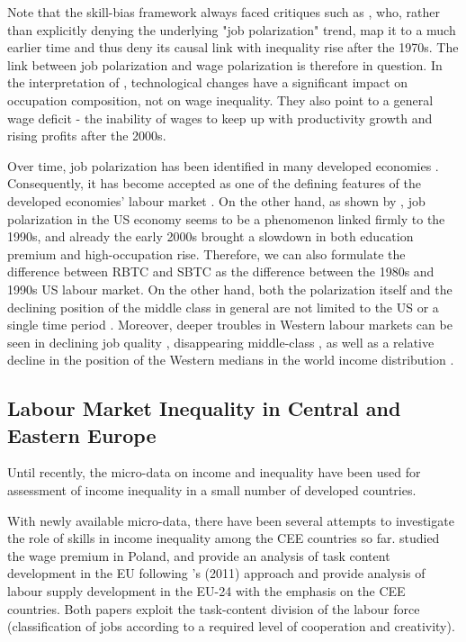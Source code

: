 \documentclass[11pt]{article}
\begin{document}
Note that the skill-bias framework always faced critiques such as \citet{mishel2013assessing}, who, rather than explicitly denying the underlying "job polarization" trend, map it to a much earlier time and thus deny its causal link with inequality rise after the 1970s. The link between job polarization and wage polarization is therefore in question. In the interpretation of \citeauthor{mishel2013assessing}, technological changes have a significant impact on occupation composition, not on wage inequality. They also point to a general wage deficit - the inability of wages to keep up with productivity growth and rising profits after the 2000s.

 Over time, job polarization has been identified in many developed economies \citep{rodrik2020economic, oecd2017}. Consequently, it has become accepted as one of the defining features of the developed economies' labour market \citep{howell2019declining}. On the other hand, as shown by \citet{mishel2013assessing}, job polarization in the US economy seems to be a phenomenon linked firmly to the 1990s, and already the early 2000s brought a slowdown in both education premium and high-occupation rise. Therefore, we can also formulate the difference between RBTC and SBTC as the difference between the 1980s and 1990s US labour market. On the other hand, both the polarization itself and the declining position of the middle class in general are not limited to the US or a single time period \citep{temin2018vanishing, rodrik2020economic}. Moreover, deeper troubles in Western labour markets can be seen in declining job quality \citep{howell2019declining}, disappearing middle-class \citep{temin2018vanishing}, as well as a relative decline in the position of the Western medians in the world income distribution \citep{milanovic2020elephant}.



\subsection{Labour Market Inequality in Central and Eastern Europe}
Until recently, the micro-data on income and inequality have been used for assessment of income inequality in a small number of developed countries.

With newly available micro-data, there have been several attempts to investigate the role of skills in income inequality among the CEE countries so far. \citet{arendt2019technical} studied the wage premium in Poland, and \citet{hardy2018educational} provide an analysis of task content development in the EU following \citeauthor{acemoglu2011skills}'s (2011) approach and provide analysis of labour supply development in the EU-24 with the emphasis on the CEE countries. Both papers exploit the task-content division of the labour force (classification of jobs according to a required level of cooperation and creativity).
\end{document}

